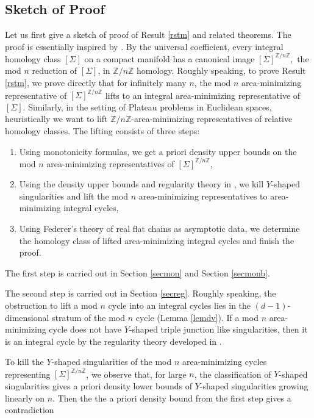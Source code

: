 \documentclass[11pt,a4paper]{amsart}
\numberwithin{equation}{section}
\newcommand{\Si}{\Sigma}
\newcommand{\Z}{\mathbb{Z}}
\theoremstyle{plain}
\theoremstyle{definition}
\numberwithin{equation}{subsection}
\begin{document}
\subsection{Sketch of Proof}\label{secsof}
Let us first give a sketch of proof of Result \ref{rstm} and related theorems. The proof is essentially inspired by \cite{FMmmn,EWW}. By the universal coefficient, every integral homology class $[\Si]$ on a compact manifold has a canonical image $[\Si]^{\Z/n\Z},$ the mod $n$ reduction of $[\Si]$, in $\Z/n\Z$ homology. Roughly speaking, to prove Result \ref{rstm}, we prove directly that for infinitely many $n$, the mod $n$ area-minimizing representative of $[\Si]^{\Z/n\Z}$ lifts to an integral area-minimizing representative of $[\Si]$. Similarly, in the setting of Plateau problems in Euclidean spaces, heuristically we want to lift $\Z/n\Z$-area-minimizing representatives of relative homology classes. The lifting consists of three steps:
\begin{enumerate}
\item Using monotonicity formulas, we get a priori density upper bounds on the mod $n$ area-minimizing representatives of $[\Si]^{\Z/n\Z}$,
\item Using the density upper bounds and regularity theory in \cite{DHMS}, we kill $Y$-shaped singularities and lift the mod $n$ area-minimizing representatives to area-minimizing integral cycles,
\item Using Federer's theory of real flat chains \cite{HFrf} as asymptotic data, we determine the homology class of lifted area-minimizing integral cycles and finish the proof.
\end{enumerate}
The first step is carried out in Section \ref{secmon} and Section \ref{secmonb}. 

The second step is carried out in Section \ref{secreg}. Roughly speaking, the obstruction to lift a mod $n$ cycle into an integral cycles lies in the $(d-1)$-dimensional stratum of the mod $n$ cycle (Lemma \ref{lemdv}). If a mod $n$ area-minimizing cycle does not have $Y$-shaped triple junction like singularities, then it is an integral cycle by the regularity theory developed in \cite{DHMS}. 

To kill the $Y$-shaped singularities of  the mod $n$ area-minimizing cycles representing $[\Si]^{\Z/n\Z}$, we observe that, for large $n$, the classification of $Y$-shaped singularities gives a priori density lower bounds of $Y$-shaped singularities growing linearly on $n$. Then the the a priori density bound from the first step gives a contradiction
\end{document}
